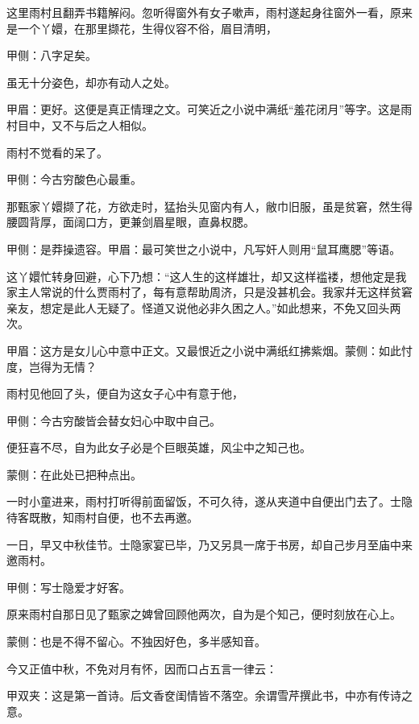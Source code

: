 \begin{parag}
    这里雨村且翻弄书籍解闷。忽听得窗外有女子嗽声，雨村遂起身往窗外一看，原来是一个丫嬛，在那里撷花，生得仪容不俗，眉目清明，\begin{note}甲侧：八字足矣。\end{note}虽无十分姿色，却亦有动人之处。\begin{note}甲眉：更好。这便是真正情理之文。可笑近之小说中满纸“羞花闭月”等字。这是雨村目中，又不与后之人相似。\end{note}雨村不觉看的呆了。\begin{note}甲侧：今古穷酸色心最重。\end{note}那甄家丫嬛撷了花，方欲走时，猛抬头见窗内有人，敝巾旧服，虽是贫窘，然生得腰圆背厚，面阔口方，更兼剑眉星眼，直鼻权腮。\begin{note}甲侧：是莽操遗容。甲眉：最可笑世之小说中，凡写奸人则用“鼠耳鹰腮”等语。\end{note}这丫嬛忙转身回避，心下乃想：“这人生的这样雄壮，却又这样褴褛，想他定是我家主人常说的什么贾雨村了，每有意帮助周济，只是没甚机会。我家幷无这样贫窘亲友，想定是此人无疑了。怪道又说他必非久困之人。”如此想来，不免又回头两次。\begin{note}甲眉：这方是女儿心中意中正文。又最恨近之小说中满纸红拂紫烟。蒙侧：如此忖度，岂得为无情？\end{note}雨村见他回了头，便自为这女子心中有意于他，\begin{note}甲侧：今古穷酸皆会替女妇心中取中自己。\end{note}便狂喜不尽，自为此女子必是个巨眼英雄，风尘中之知己也。\begin{note}蒙侧：在此处已把种点出。\end{note}一时小童进来，雨村打听得前面留饭，不可久待，遂从夹道中自便出门去了。士隐待客既散，知雨村自便，也不去再邀。
\end{parag}


\begin{parag}
    一日，早又中秋佳节。士隐家宴已毕，乃又另具一席于书房，却自己步月至庙中来邀雨村。\begin{note}甲侧：写士隐爱才好客。\end{note}原来雨村自那日见了甄家之婢曾回顾他两次，自为是个知己，便时刻放在心上。\begin{note}蒙侧：也是不得不留心。不独因好色，多半感知音。\end{note}今又正值中秋，不免对月有怀，因而口占五言一律云：\begin{note}甲双夹：这是第一首诗。后文香奁闺情皆不落空。余谓雪芹撰此书，中亦有传诗之意。\end{note}
\end{parag}


